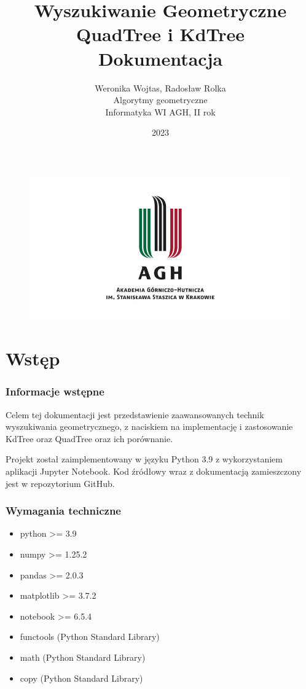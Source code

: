 \documentclass{lab}
\begin{document}
\captionsetup[lstlisting]{labelformat=myformat}

\begin{figure}
    \centering
    \includegraphics{resources/agh.png}
\end{figure}
\title{\Huge \textbf{Wyszukiwanie Geometryczne}\\QuadTree i KdTree \\ \huge Dokumentacja}
\author{Weronika Wojtas, Radosław Rolka\\Algorytmy geometryczne\\Informatyka WI AGH, II rok}
\date{2023}

\maketitle
\newpage
\tableofcontents
\thispagestyle{fancy} 
\newpage

\part{Wstęp}
\section{Informacje wstępne}
Celem tej dokumentacji jest przedstawienie zaawansowanych technik wyszukiwania geometrycznego, z naciskiem na implementację i zastosowanie KdTree oraz QuadTree oraz ich porównanie.

Projekt został zaimplementowany w języku Python 3.9 z wykorzystaniem aplikacji Jupyter Notebook. Kod źródłowy wraz z dokumentacją zamieszczony jest w repozytorium GitHub.

\section{Wymagania techniczne}
\begin{itemize}
    \item python >= 3.9
    \item numpy >= 1.25.2
    \item pandas >= 2.0.3
    \item matplotlib >= 3.7.2
    \item notebook >= 6.5.4
    \item functools (Python Standard Library)
    \item math (Python Standard Library)
    \item copy (Python Standard Library)
\end{itemize}
\end{document}
